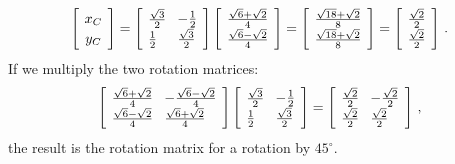 \documentclass[11pt,a4paper]{report}
\newcommand*{\spacearray}{
\renewcommand{\arraystretch}{1.2}
\setlength{\arraycolsep}{4pt}
}
\begin{document}
\begin{displaymath}
\spacearray
\left[ 
\begin{array}{c} x_C\\ y_C \end{array}
\right] = 
\left[
\begin{array}{l} \frac{\sqrt{3}}{2} \\ \frac{1}{2} \end{array}\\
\begin{array}{l} -\frac{1}{2} \\ \frac{\sqrt{3}}{2} \end{array}\\
\right]
\left[
\begin{array}{l} \frac{\sqrt{6}+\sqrt{2}}{4} \\ \frac{\sqrt{6}-\sqrt{2}}{4} \end{array}\\
\right]=
\left[
\begin{array}{l} \frac{\sqrt{18}+\sqrt{2}}{8} \\ \frac{\sqrt{18}+\sqrt{2}}{8} \end{array}\\
\right]=
\left[
\begin{array}{l} \frac{\sqrt{2}}{2} \\ \frac{\sqrt{2}}{2} \end{array}\\
\right]\,.
\end{displaymath}
If we multiply the two rotation matrices:
\begin{displaymath}
\spacearray
\left[
\begin{array}{l} \frac{\sqrt{6}+\sqrt{2}}{4} \\ \frac{\sqrt{6}-\sqrt{2}}{4} \end{array}\\
\begin{array}{l} -\frac{\sqrt{6}-\sqrt{2}}{4} \\ \frac{\sqrt{6}+\sqrt{2}}{4} \end{array}\\
\right]
\left[
\begin{array}{l} \frac{\sqrt{3}}{2} \\ \frac{1}{2} \end{array}\\
\begin{array}{l} -\frac{1}{2} \\ \frac{\sqrt{3}}{2} \end{array}\\
\right]=
\left[
\begin{array}{l} \frac{\sqrt{2}}{2} \\ \frac{\sqrt{2}}{2} \end{array}\\
\begin{array}{l} -\frac{\sqrt{2}}{2} \\ \frac{\sqrt{2}}{2} \end{array}\\
\right]\,,
\end{displaymath}
the result is the rotation matrix for a rotation by $45^\circ$.
\end{document}
